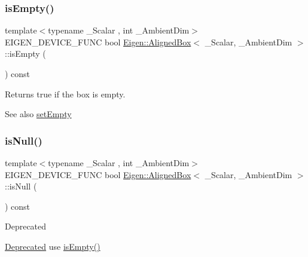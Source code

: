 \subsubsection{\texorpdfstring{isEmpty()}{isEmpty()}}
{\footnotesize\ttfamily template$<$typename \+\_\+\+Scalar , int \+\_\+\+Ambient\+Dim$>$ \\
E\+I\+G\+E\+N\+\_\+\+D\+E\+V\+I\+C\+E\+\_\+\+F\+U\+NC bool \mbox{\hyperlink{class_eigen_1_1_aligned_box}{Eigen\+::\+Aligned\+Box}}$<$ \+\_\+\+Scalar, \+\_\+\+Ambient\+Dim $>$\+::is\+Empty (\begin{DoxyParamCaption}{ }\end{DoxyParamCaption}) const\hspace{0.3cm}{\ttfamily [inline]}}

\begin{DoxyReturn}{Returns}
true if the box is empty. 
\end{DoxyReturn}
\begin{DoxySeeAlso}{See also}
\mbox{\hyperlink{class_eigen_1_1_aligned_box_ae946a0964de83d4e688fa462fe6d6725}{set\+Empty}} 
\end{DoxySeeAlso}
\mbox{\label{class_eigen_1_1_aligned_box_a441638bbddbd4c8924cec736e7af7f96}} 
\subsubsection{\texorpdfstring{isNull()}{isNull()}}
{\footnotesize\ttfamily template$<$typename \+\_\+\+Scalar , int \+\_\+\+Ambient\+Dim$>$ \\
E\+I\+G\+E\+N\+\_\+\+D\+E\+V\+I\+C\+E\+\_\+\+F\+U\+NC bool \mbox{\hyperlink{class_eigen_1_1_aligned_box}{Eigen\+::\+Aligned\+Box}}$<$ \+\_\+\+Scalar, \+\_\+\+Ambient\+Dim $>$\+::is\+Null (\begin{DoxyParamCaption}{ }\end{DoxyParamCaption}) const\hspace{0.3cm}{\ttfamily [inline]}}

\begin{DoxyRefDesc}{Deprecated}
\item[\mbox{\hyperlink{deprecated__deprecated000026}{Deprecated}}]use \mbox{\hyperlink{class_eigen_1_1_aligned_box_a0d194e2e56c3bef854e88ca2aba04c9e}{is\+Empty()}} \end{DoxyRefDesc}
\mbox{\label{class_eigen_1_1_aligned_box_ad10b1fa3021f705e3104d09b8842c37e}} 

